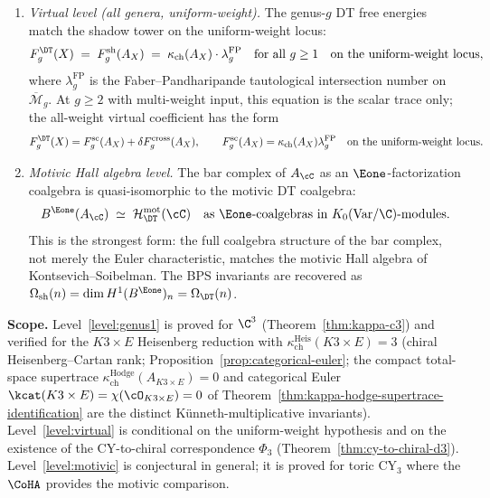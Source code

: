 \begin{conjecture}
\begin{enumerate}[label=\textup{(L\arabic*)}]
\item\label{level:virtual} \emph{Virtual level (all genera, uniform-weight).} The genus-$g$ DT free energies match the shadow tower on the uniform-weight locus:
\begin{equation}
\label{eq:shadow-dt-allgenus}
 F_g^{\DT}(X) \;=\; F_g^{\mathrm{sh}}(A_X) \;=\; \kappa_{\mathrm{ch}}(A_X) \cdot \lambda_g^{\mathrm{FP}}
 \quad\text{for all } g \geq 1
 \quad\text{on the uniform-weight locus},
\end{equation}
where $\lambda_g^{\mathrm{FP}}$ is the Faber--Pandharipande tautological intersection number on $\overline{\mathcal{M}}_g$. At $g \geq 2$ with multi-weight input, this equation is the scalar trace only; the all-weight virtual coefficient has the form
\[
 F_g^{\DT}(X)=F_g^{\mathrm{sc}}(A_X)+\delta F_g^{\mathrm{cross}}(A_X),
 \qquad
 F_g^{\mathrm{sc}}(A_X)=\kappa_{\mathrm{ch}}(A_X)\lambda_g^{\mathrm{FP}}
 \quad\textup{on the uniform-weight locus}.
\]

\item\label{level:motivic} \emph{Motivic Hall algebra level.} The bar complex of $A_\cC$ as an $\Eone$-factorization coalgebra is quasi-isomorphic to the motivic DT coalgebra:
\begin{equation}
\label{eq:shadow-dt-motivic}
 B^{\Eone}(A_\cC) \;\simeq\; \mathcal{H}_{\DT}^{\mathrm{mot}}(\cC)
 \quad\text{as } \Eone\text{-coalgebras in } K_0(\mathrm{Var}/\C)\text{-modules}.
\end{equation}
This is the strongest form: the full coalgebra structure of the bar complex, not merely the Euler characteristic, matches the motivic Hall algebra of Kontsevich--Soibelman. The BPS invariants are recovered as $\Omega_{\mathrm{sh}}(n) = \dim H^1(B^{\Eone})_n = \Omega_{\DT}(n)$.

\end{enumerate}

\medskip\noindent\textbf{Scope.}
Level~\ref{level:genus1} is proved for $\C^3$ (Theorem~\textup{\ref{thm:kappa-c3}}) and verified for the $K3 \times E$ Heisenberg reduction with $\kappa_{\mathrm{ch}}^{\mathrm{Heis}}(K3 \times E) = 3$ (chiral Heisenberg--Cartan rank; Proposition~\textup{\ref{prop:categorical-euler}}; the compact total-space supertrace $\kappa_{\mathrm{ch}}^{\mathrm{Hodge}}(A_{K3 \times E}) = 0$ and categorical Euler $\kcat(K3 \times E) = \chi(\cO_{K3 \times E}) = 0$ of Theorem~\ref{thm:kappa-hodge-supertrace-identification} are the distinct K\"unneth-multiplicative invariants). Level~\ref{level:virtual} is conditional on the uniform-weight hypothesis and on the existence of the CY-to-chiral correspondence $\Phi_3$ (Theorem~\textup{\ref{thm:cy-to-chiral-d3}}). Level~\ref{level:motivic} is conjectural in general; it is proved for toric CY$_3$ where the $\CoHA$ provides the motivic comparison.


\end{conjecture}
